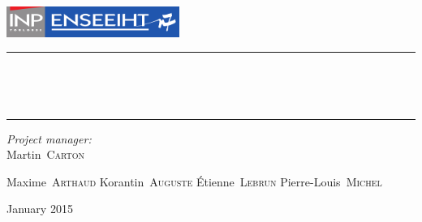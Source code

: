 \begin{titlepage}
  \begin{center}
    \includegraphics[height=1cm]{LogoEnseeiht}\\\vspace{1cm}
    \hrule\vspace{0.5cm}
    \textsc{\Large\thesubtitle}
    \\\vspace{0.5cm}

    \textbf{\huge\thetitle}
    \\\vspace{0.4cm}
    \hrule\vspace{2cm}

    \begin{minipage}{0.4\textwidth}
      \begin{flushleft} \large
        \emph{Project manager:}\\\hspace{1cm}Martin~\textsc{Carton}
      \end{flushleft}
    \end{minipage}
    \begin{minipage}{0.4\textwidth}
      \begin{flushright} \large
          Maxime~\textsc{Arthaud}
          Korantin~\textsc{Auguste}
          Étienne~\textsc{Lebrun}
          Pierre-Louis~\textsc{Michel}
      \end{flushright}
    \end{minipage}

    \vfill
    {\large January 2015}
  \end{center}
\end{titlepage}
